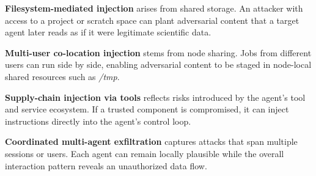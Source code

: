  \textbf{Filesystem-mediated injection} arises from shared storage. An attacker with access to a project or scratch space can plant adversarial content that a target agent later reads as if it were legitimate scientific data.

 \textbf{Multi-user co-location injection} stems from node sharing. Jobs from different users can run side by side, enabling adversarial content to be staged in node-local shared resources such as \textit{/tmp}.

 \textbf{Supply-chain injection via tools} reflects risks introduced by the agent's tool and service ecosystem. If a trusted component is compromised, it can inject instructions directly into the agent's control loop.

 \textbf{Coordinated multi-agent exfiltration} captures attacks that span multiple sessions or users. Each agent can remain locally plausible while the overall interaction pattern reveals an unauthorized data flow.
